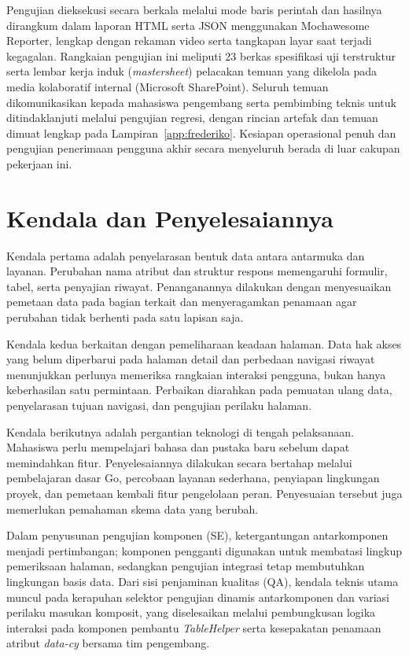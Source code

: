 Pengujian dieksekusi secara berkala melalui mode baris perintah dan hasilnya dirangkum dalam laporan HTML serta JSON menggunakan Mochawesome Reporter, lengkap dengan rekaman video serta tangkapan layar saat terjadi kegagalan. Rangkaian pengujian ini meliputi 23 berkas spesifikasi uji terstruktur serta lembar kerja induk (\textit{mastersheet}) pelacakan temuan yang dikelola pada media kolaboratif internal (Microsoft SharePoint). Seluruh temuan dikomunikasikan kepada mahasiswa pengembang serta pembimbing teknis untuk ditindaklanjuti melalui pengujian regresi, dengan rincian artefak dan temuan dimuat lengkap pada Lampiran~\ref{app:frederiko}. Kesiapan operasional penuh dan pengujian penerimaan pengguna akhir secara menyeluruh berada di luar cakupan pekerjaan ini.

\section{Kendala dan Penyelesaiannya}
Kendala pertama adalah penyelarasan bentuk data antara antarmuka dan layanan. Perubahan nama atribut dan struktur respons memengaruhi formulir, tabel, serta penyajian riwayat. Penanganannya dilakukan dengan menyesuaikan pemetaan data pada bagian terkait dan menyeragamkan penamaan agar perubahan tidak berhenti pada satu lapisan saja.

Kendala kedua berkaitan dengan pemeliharaan keadaan halaman. Data hak akses yang belum diperbarui pada halaman detail dan perbedaan navigasi riwayat menunjukkan perlunya memeriksa rangkaian interaksi pengguna, bukan hanya keberhasilan satu permintaan. Perbaikan diarahkan pada pemuatan ulang data, penyelarasan tujuan navigasi, dan pengujian perilaku halaman.

Kendala berikutnya adalah pergantian teknologi di tengah pelaksanaan. Mahasiswa perlu mempelajari bahasa dan pustaka baru sebelum dapat memindahkan fitur. Penyelesaiannya dilakukan secara bertahap melalui pembelajaran dasar Go, percobaan layanan sederhana, penyiapan lingkungan proyek, dan pemetaan kembali fitur pengelolaan peran. Penyesuaian tersebut juga memerlukan pemahaman skema data yang berubah.

Dalam penyusunan pengujian komponen (SE), ketergantungan antarkomponen menjadi pertimbangan; komponen pengganti digunakan untuk membatasi lingkup pemeriksaan halaman, sedangkan pengujian integrasi tetap membutuhkan lingkungan basis data. Dari sisi penjaminan kualitas (QA), kendala teknis utama muncul pada kerapuhan selektor pengujian dinamis antarkomponen dan variasi perilaku masukan komposit, yang diselesaikan melalui pembungkusan logika interaksi pada komponen pembantu \textit{TableHelper} serta kesepakatan penamaan atribut \textit{data-cy} bersama tim pengembang.
